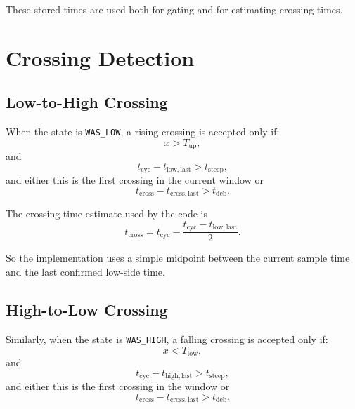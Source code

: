 \documentclass[conference]{IEEEtran}
\begin{document}
    These stored times are used both for gating and for estimating crossing times.

    \section{Crossing Detection}

    \subsection{Low-to-High Crossing}

    When the state is \texttt{WAS\_LOW}, a rising crossing is accepted only if:
    \begin{equation}
        x > T_{\mathrm{up}},
    \end{equation}
    and
    \begin{equation}
        t_{\mathrm{cyc}} - t_{\mathrm{low,last}} > t_{\mathrm{steep}},
    \end{equation}
    and either this is the first crossing in the current window or
    \begin{equation}
        t_{\mathrm{cross}} - t_{\mathrm{cross,last}} > t_{\mathrm{deb}}.
    \end{equation}

    The crossing time estimate used by the code is
    \begin{equation}
        t_{\mathrm{cross}}
        =
        t_{\mathrm{cyc}}
        - \frac{t_{\mathrm{cyc}} - t_{\mathrm{low,last}}}{2}.
    \end{equation}

    So the implementation uses a simple midpoint between the current sample time
    and the last confirmed low-side time.

    \subsection{High-to-Low Crossing}

    Similarly, when the state is \texttt{WAS\_HIGH}, a falling crossing is
    accepted only if:
    \begin{equation}
        x < T_{\mathrm{low}},
    \end{equation}
    and
    \begin{equation}
        t_{\mathrm{cyc}} - t_{\mathrm{high,last}} > t_{\mathrm{steep}},
    \end{equation}
    and either this is the first crossing in the window or
    \begin{equation}
        t_{\mathrm{cross}} - t_{\mathrm{cross,last}} > t_{\mathrm{deb}}.
    \end{equation}
\end{document}
